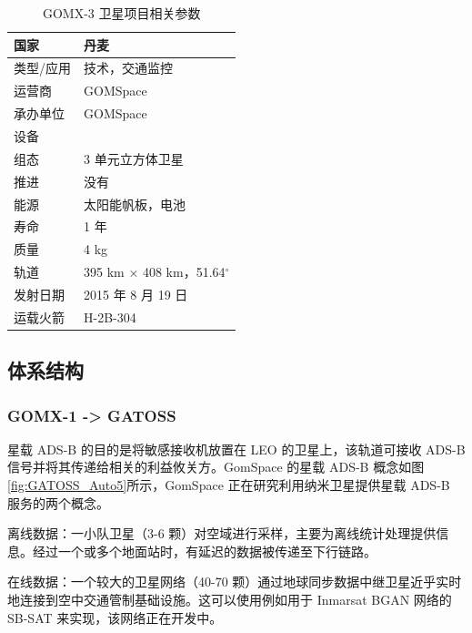 
\renewcommand\arraystretch{1.5}
\begin{table}[!htb]
\centering
\caption{GOMX-3 卫星项目相关参数\protect\footnotemark}
\label{tab:gatoss_satellite_program}
\begin{tabular}[b]{|p{3cm}<{\raggedleft}|p{6cm}<{\raggedright}|}
\hline
国家 & 丹麦 \\
\hline
类型/应用 &  技术，交通监控 \\
\hline
运营商 &  GOMSpace \\
\hline
承办单位 &  GOMSpace \\
\hline
设备 &  \\
\hline
组态 & 3 单元立方体卫星 \\
\hline
推进 & 没有 \\
\hline
能源 & 太阳能帆板，电池 \\
\hline
寿命 & 1 年 \\
\hline
质量 & 4 kg \\
\hline
轨道 & 395 km × 408 km，51.64$^\circ$ \\
\hline
发射日期 & 2015 年 8 月 19 日 \\
\hline
运载火箭 & H-2B-304 \\
\hline
\end{tabular}
\end{table}


\subsection{体系结构}

\subsubsection{GOMX-1 -> GATOSS}

星载 ADS-B 的目的是将敏感接收机放置在 LEO 的卫星上，该轨道可接收 ADS-B 信号并将其传递给相关的利益攸关方。GomSpace 的星载 ADS-B 概念如图\ref{fig:GATOSS_Auto5}所示，GomSpace 正在研究利用纳米卫星提供星载 ADS-B 服务的两个概念。

离线数据：一小队卫星（3-6 颗）对空域进行采样，主要为离线统计处理提供信息。经过一个或多个地面站时，有延迟的数据被传递至下行链路。

在线数据：一个较大的卫星网络（40-70 颗）通过地球同步数据中继卫星近乎实时地连接到空中交通管制基础设施。这可以使用例如用于 Inmarsat BGAN 网络的 SB-SAT 来实现，该网络正在开发中。

